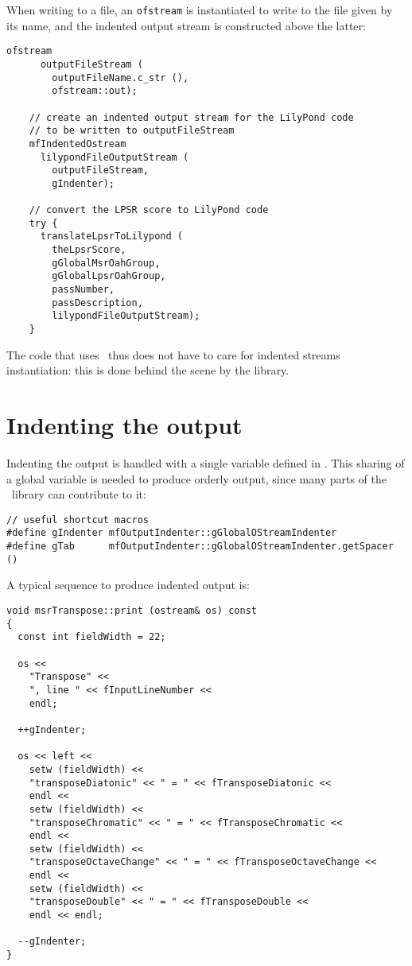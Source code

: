 When writing to a file, an {\tt ofstream} is instantiated to write to the file given by its name, and the indented output stream is constructed above the latter:
\begin{lstlisting}[language=CPlusPlus]
     ofstream
      outputFileStream (
        outputFileName.c_str (),
        ofstream::out);

    // create an indented output stream for the LilyPond code
    // to be written to outputFileStream
    mfIndentedOstream
      lilypondFileOutputStream (
        outputFileStream,
        gIndenter);

    // convert the LPSR score to LilyPond code
    try {
      translateLpsrToLilypond (
        theLpsrScore,
        gGlobalMsrOahGroup,
        gGlobalLpsrOahGroup,
        passNumber,
        passDescription,
        lilypondFileOutputStream);
    }
\end{lstlisting}

The code that uses \mf\ thus does not have to care for indented streams instantiation: this is done behind the scene by the library.


\section{Indenting the output}

Indenting the output is handled with a single variable defined in .
This sharing of a global variable is needed to produce orderly output, since many parts of the \mf\ library can contribute to it:
\begin{lstlisting}[language=CPlusPlus]
// useful shortcut macros
#define gIndenter mfOutputIndenter::gGlobalOStreamIndenter
#define gTab      mfOutputIndenter::gGlobalOStreamIndenter.getSpacer ()
\end{lstlisting}

A typical sequence to produce indented output is:
\begin{lstlisting}[language=CPlusPlus]
void msrTranspose::print (ostream& os) const
{
  const int fieldWidth = 22;

  os <<
    "Transpose" <<
    ", line " << fInputLineNumber <<
    endl;

  ++gIndenter;

  os << left <<
    setw (fieldWidth) <<
    "transposeDiatonic" << " = " << fTransposeDiatonic <<
    endl <<
    setw (fieldWidth) <<
    "transposeChromatic" << " = " << fTransposeChromatic <<
    endl <<
    setw (fieldWidth) <<
    "transposeOctaveChange" << " = " << fTransposeOctaveChange <<
    endl <<
    setw (fieldWidth) <<
    "transposeDouble" << " = " << fTransposeDouble <<
    endl << endl;

  --gIndenter;
}
\end{lstlisting}

